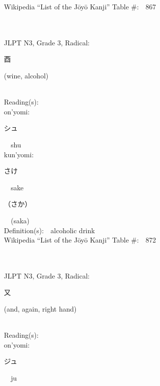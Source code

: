 \begin{multicols}{2}
Wikipedia ``List of the J\=oy\=o Kanji'' Table \#:\ \ 867 \\
\ \ \\
{\fontsize{34pt}{40pt}  }\ \ \\  %
{JLPT N3, Grade 3, Radical:\ \ {\begin{CJK}{UTF8}{min} 酉 \end{CJK}} (wine, alcohol) } \\
Reading(s):\ \ \\
{\hspace*{1em}}on'yomi:\ \ \\
{\hspace*{2em}}{\begin{CJK}{UTF8}{min} シュ \end{CJK}}\ \ shu\ \ \\
{\hspace*{1em}}kun'yomi:\ \ \\
{\hspace*{2em}}{\begin{CJK}{UTF8}{min} さけ \end{CJK}}\ \ sake\ \ \\
{\hspace*{2em}}{\begin{CJK}{UTF8}{min} （さか） \end{CJK}}\ \ (saka)\ \ \\
Definition(s):\ \ alcoholic drink \\
Wikipedia ``List of the J\=oy\=o Kanji'' Table \#:\ \ 872 \\
\ \ \\
{\fontsize{34pt}{40pt}  }\ \ \\  %
{JLPT N3, Grade 3, Radical:\ \ {\begin{CJK}{UTF8}{min} 又 \end{CJK}} (and, again, right hand) } \\
Reading(s):\ \ \\
{\hspace*{1em}}on'yomi:\ \ \\
{\hspace*{2em}}{\begin{CJK}{UTF8}{min} ジュ \end{CJK}}\ \ ju\ \ \\

\end{multicols}
